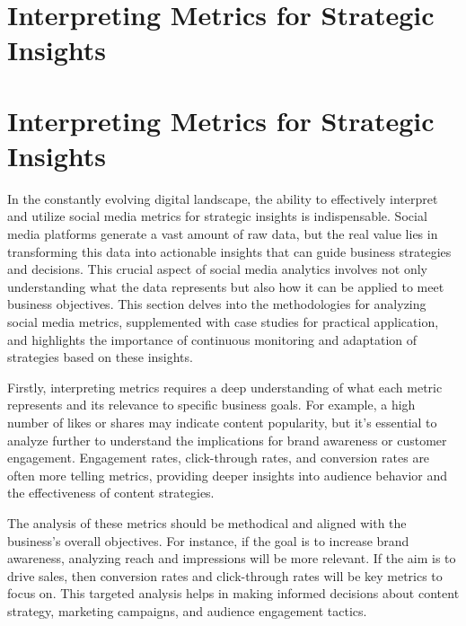\documentclass[
]{book}
\begin{document}
\hypertarget{interpreting-metrics-for-strategic-insights}{%
\section*{Interpreting Metrics for Strategic Insights}\label{interpreting-metrics-for-strategic-insights}}

\hypertarget{interpreting-metrics-for-strategic-insights-1}{%
\section{Interpreting Metrics for Strategic Insights}\label{interpreting-metrics-for-strategic-insights-1}}

In the constantly evolving digital landscape, the ability to effectively interpret and utilize social media metrics for strategic insights is indispensable. Social media platforms generate a vast amount of raw data, but the real value lies in transforming this data into actionable insights that can guide business strategies and decisions. This crucial aspect of social media analytics involves not only understanding what the data represents but also how it can be applied to meet business objectives. This section delves into the methodologies for analyzing social media metrics, supplemented with case studies for practical application, and highlights the importance of continuous monitoring and adaptation of strategies based on these insights.

Firstly, interpreting metrics requires a deep understanding of what each metric represents and its relevance to specific business goals. For example, a high number of likes or shares may indicate content popularity, but it's essential to analyze further to understand the implications for brand awareness or customer engagement. Engagement rates, click-through rates, and conversion rates are often more telling metrics, providing deeper insights into audience behavior and the effectiveness of content strategies.

The analysis of these metrics should be methodical and aligned with the business's overall objectives. For instance, if the goal is to increase brand awareness, analyzing reach and impressions will be more relevant. If the aim is to drive sales, then conversion rates and click-through rates will be key metrics to focus on. This targeted analysis helps in making informed decisions about content strategy, marketing campaigns, and audience engagement tactics.
\end{document}
